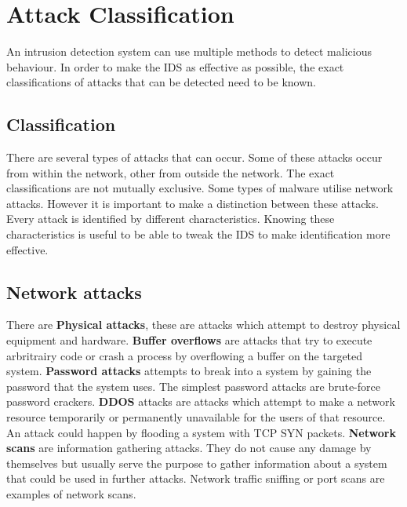 
\chapter{Attack Classification} %

\label{attack} %

An intrusion detection system can use multiple methods to detect malicious behaviour. In order to make the IDS as effective as possible, the exact classifications of attacks that can be detected need to be known.

\section{Classification}
There are several types of attacks that can occur. Some of these attacks occur from within the network, other from outside the network. The exact classifications are not mutually exclusive. Some types of malware utilise network attacks. However it is important to make a distinction between these attacks. Every attack is identified by different characteristics. Knowing these characteristics is useful to be able to tweak the IDS to make identification more effective.

\section{Network attacks}
There are \textbf{Physical attacks}, these are attacks which attempt to destroy physical equipment and hardware. \textbf{Buffer overflows} are attacks that try to execute arbritrairy code or crash a process by overflowing a buffer on the targeted system. \textbf{Password attacks} attempts to break into a system by gaining the password that the system uses. The simplest password attacks are brute-force password crackers. \textbf{DDOS} attacks are attacks which attempt to make a network resource temporarily or permanently unavailable for the users of that resource. An attack could happen by flooding a system with TCP SYN packets. \textbf{Network scans} are information gathering attacks. They do not cause any damage by themselves but usually serve the purpose to gather information about a system that could be used in further attacks. Network traffic sniffing or port scans are examples of network scans. \cite{IPFlow}

